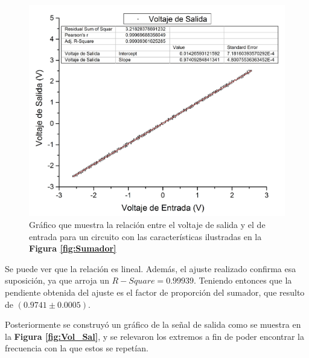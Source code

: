\documentclass[11pt,a4paper]{article}
\begin{document}
\begin{figure}[h]
\centering
\includegraphics[scale=0.35]{Salida_vs_Entrada}
\caption{Gráfico que muestra la relación entre el voltaje de salida y el de entrada para un circuito con las características ilustradas en la \textbf{Figura \ref{fig:Sumador}}}
\label{fig:S_vs_E}
\end{figure}

Se puede ver que la relación es lineal. Además, el ajuste realizado confirma esa suposición, ya que arroja un $R-Square=0.99939$. Teniendo entonces que la pendiente obtenida del ajuste es el factor de proporción del sumador, que resulto de $(0.9741 \pm 0.0005)$. 

Posteriormente se construyó un gráfico de la señal de salida como se muestra en la \textbf{Figura \ref{fig:Vol_Sal}}, y se relevaron los extremos a fin de poder encontrar la frecuencia con la que estos se repetían.
\end{document}
